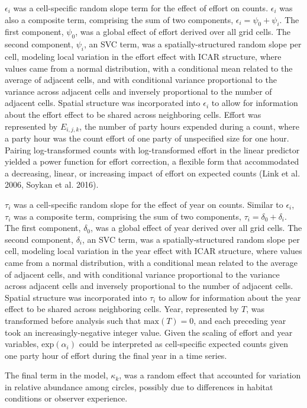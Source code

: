 \documentclass[]{article}
\begin{document}
$\epsilon_i$ was a cell-specific random slope term for the effect of effort on counts. $\epsilon_i$ was also a composite term, comprising the sum of two components, $\epsilon_i = \psi_0 + \psi_i$. The first component, $\psi_0$, was a global effect of effort derived over all grid cells. The second component, $\psi_i$, an SVC term, was a spatially-structured random slope per cell, modeling local variation in the effort effect with ICAR structure, where values came from a normal distribution, with a conditional mean related to the average of adjacent cells, and with conditional variance proportional to the variance across adjacent cells and inversely proportional to the number of adjacent cells. Spatial structure was incorporated into $\epsilon_i$ to allow for information about the effort effect to be shared across neighboring cells. Effort was represented by $E_{i,j,k}$, the number of party hours expended during a count, where a party hour was the count effort of one party of unspecified size for one hour. Pairing log-transformed counts with log-transformed effort in the linear predictor yielded a power function for effort correction, a flexible form that accommodated a decreasing, linear, or increasing impact of effort on expected counts (Link et al. 2006, Soykan et al. 2016).  

$\tau_i$ was a cell-specific random slope for the effect of year on counts. Similar to $\epsilon_i$, $\tau_i$ was a composite term, comprising the sum of two components, $\tau_i = \delta_0 + \delta_i$. The first component, $\delta_0$, was a global effect of year derived over all grid cells. The second component, $\delta_i$, an SVC term, was a spatially-structured random slope per cell, modeling local variation in the year effect with ICAR structure, where values came from a normal distribution, with a conditional mean related to the average of adjacent cells, and with conditional variance proportional to the variance across adjacent cells and inversely proportional to the number of adjacent cells. Spatial structure was incorporated into $\tau_i$ to allow for information about the year effect to be shared across neighboring cells. Year, represented by $T$, was transformed before analysis such that $\text{max}(T) = 0$, and each preceding year took an increasingly-negative integer value. Given the scaling of effort and year variables, $\text{exp}(\alpha_i)$ could be interpreted as cell-specific expected counts given one party hour of effort during the final year in a time series.

The final term in the model, $\kappa_{k}$, was a random effect that accounted for variation in relative abundance among circles, possibly due to differences in habitat conditions or observer experience.
\end{document}
